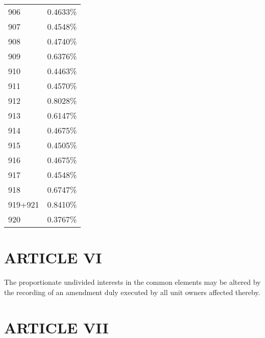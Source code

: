 \documentclass[
]{book}
\begin{document}
\begin{longtable}[]{@{}ll@{}}
906 & 0.4633\% \\
907 & 0.4548\% \\
908 & 0.4740\% \\
909 & 0.6376\% \\
910 & 0.4463\% \\
911 & 0.4570\% \\
912 & 0.8028\% \\
913 & 0.6147\% \\
914 & 0.4675\% \\
915 & 0.4505\% \\
916 & 0.4675\% \\
917 & 0.4548\% \\
918 & 0.6747\% \\
919+921 & 0.8410\% \\
920 & 0.3767\% \\
\bottomrule
\end{longtable}

\hypertarget{article-vi}{%
\section*{ARTICLE VI}\label{article-vi}}

The proportionate undivided interests in the common elements may be altered by the recording of an amendment duly executed by all unit owners affected thereby.

\hypertarget{article-vii}{%
\section*{ARTICLE VII}\label{article-vii}}
\end{document}

